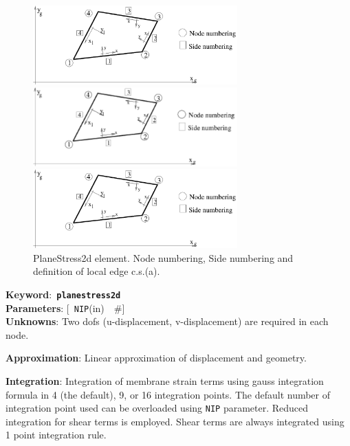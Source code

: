\documentclass[a4paper]{article}
\newcommand{\descitem}[1]{{\noindent \bf #1}:}
\newcommand{\elemkeyword}[1]{\descitem{Keyword}~{\bf \texttt{#1}}}
\newcommand{\elemparam}[2]{{{\texttt{#1}\tiny (#2)}~~\#}}
\newcommand{\optelemparam}[2]{{[~\elemparam{#1}{#2}]}}
\newcommand{\param}[1]{{\texttt{#1}}}
\begin{document}
\begin{figure}[tb]
\begin{htmlonly}
  \centerline{\includegraphics[width=0.7\textwidth]{planestress2d.eps}}
\end{htmlonly}
\ifpdf
\centerline{\includegraphics[width=0.7\textwidth]{planestress2d.pdf}}
\else
\centerline{\includegraphics[width=0.7\textwidth]{planestress2d.eps}}
\fi
\caption{PlaneStress2d element. Node numbering, Side numbering and
definition of local edge c.s.(a).}
\label{Planestress2dfig}
\end{figure}

\elemkeyword{planestress2d}\\
\descitem{Parameters} \optelemparam{NIP}{in}\\
\descitem{Unknowns}
Two dofs (u-displacement, v-displacement) are required in each node.

\descitem{Approximation} Linear approximation of displacement and
geometry.

\descitem{Integration}
Integration of membrane strain terms using gauss integration formula
in 4 (the default), 9, or 16 integration points. The default number of
integration point used can be overloaded using \param{NIP} parameter.
Reduced integration for shear terms is employed. Shear terms are
always integrated using 1 point integration rule.
\end{document}
